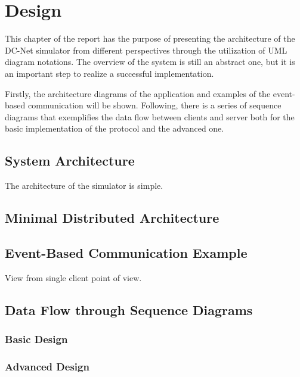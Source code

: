 \chapter{Design}
This chapter of the report has the purpose of presenting the architecture of the DC-Net simulator from different perspectives through the utilization of UML diagram notations. The overview of the system is still an abstract one, but it is an important step to realize a successful implementation. 

Firstly, the architecture diagrams of the application and examples of the event-based communication will be shown. Following, there is a series of sequence diagrams that exemplifies the data flow between clients and server both for the basic implementation of the protocol and the advanced one.


\section{System Architecture}
The architecture of the simulator is simple.  


\section{Minimal Distributed Architecture}



\section{Event-Based Communication Example}
View from single client point of view.

\section{Data Flow through Sequence Diagrams}


\subsection{Basic Design}


\subsection{Advanced Design}



